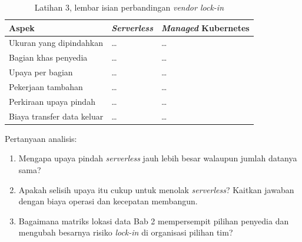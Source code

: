 \begin{table}[!htb]
  \centering
  \caption{Latihan 3, lembar isian perbandingan \textit{vendor lock-in}}
  \label{tab:ch08-lat3-hasil}
  \footnotesize
  \begin{tabularx}{\textwidth}{>{\raggedright\arraybackslash}p{2.6cm}
      >{\raggedright\arraybackslash}X >{\raggedright\arraybackslash}X}
    \hline
    \textbf{Aspek} & \textbf{\textit{Serverless}} & \textbf{\textit{Managed} Kubernetes} \\ \hline
    Ukuran yang dipindahkan & \dots & \dots \\ \hline
    Bagian khas penyedia & \dots & \dots \\ \hline
    Upaya per bagian & \dots & \dots \\ \hline
    Pekerjaan tambahan & \dots & \dots \\ \hline
    Perkiraan upaya pindah & \dots & \dots \\ \hline
    Biaya transfer data keluar & \dots & \dots \\ \hline
  \end{tabularx}
\end{table}

Pertanyaan analisis:
\begin{enumerate}
  \item Mengapa upaya pindah \textit{serverless} jauh lebih besar walaupun jumlah datanya sama?
  \item Apakah selisih upaya itu cukup untuk menolak \textit{serverless}? Kaitkan jawaban dengan
        biaya operasi dan kecepatan membangun.
  \item Bagaimana matriks lokasi data Bab 2 mempersempit pilihan penyedia dan mengubah besarnya
        risiko \textit{lock-in} di organisasi pilihan tim?
\end{enumerate}
